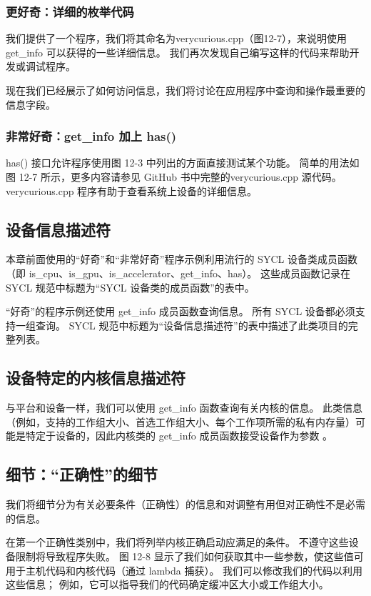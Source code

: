 \subsubsection{更好奇：详细的枚举代码}
我们提供了一个程序，我们将其命名为verycurious.cpp（图12-7），来说明使用get\_info 可以获得的一些详细信息。 我们再次发现自己编写这样的代码来帮助开发或调试程序。

现在我们已经展示了如何访问信息，我们将讨论在应用程序中查询和操作最重要的信息字段。

\subsubsection{非常好奇：get\_info 加上 has()}
has() 接口允许程序使用图 12-3 中列出的方面直接测试某个功能。 简单的用法如图 12-7 所示，更多内容请参见 GitHub 书中完整的verycurious.cpp 源代码。 verycurious.cpp 程序有助于查看系统上设备的详细信息。

\subsection{设备信息描述符}
本章前面使用的“好奇”和“非常好奇”程序示例利用流行的 SYCL 设备类成员函数（即 is\_cpu、is\_gpu、is\_accelerator、get\_info、has）。 这些成员函数记录在 SYCL 规范中标题为“SYCL 设备类的成员函数”的表中。

“好奇”的程序示例还使用 get\_info 成员函数查询信息。 所有 SYCL 设备都必须支持一组查询。 SYCL 规范中标题为“设备信息描述符”的表中描述了此类项目的完整列表。

\subsection{设备特定的内核信息描述符}
与平台和设备一样，我们可以使用 get\_info 函数查询有关内核的信息。 此类信息（例如，支持的工作组大小、首选工作组大小、每个工作项所需的私有内存量）可能是特定于设备的，因此内核类的 get\_info 成员函数接受设备作为参数 。

\subsection{细节：“正确性”的细节}
我们将细节分为有关必要条件（正确性）的信息和对调整有用但对正确性不是必需的信息。

在第一个正确性类别中，我们将列举内核正确启动应满足的条件。 不遵守这些设备限制将导致程序失败。 图 12-8 显示了我们如何获取其中一些参数，使这些值可用于主机代码和内核代码（通过 lambda 捕获）。 我们可以修改我们的代码以利用这些信息； 例如，它可以指导我们的代码确定缓冲区大小或工作组大小。

